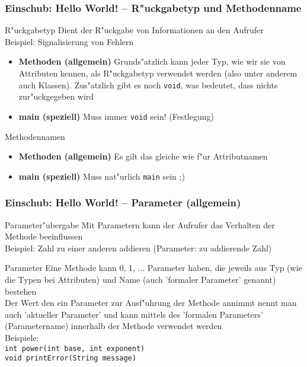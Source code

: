 \documentclass{beamer}
\begin{document}
\begin{frame}
\frametitle{Einschub: Hello World! -- R"uckgabetyp und Methodenname}
\begin{block}{R"uckgabetyp}
Dient der R"uckgabe von Informationen an den Aufrufer\\
Beispiel: Signalisierung von Fehlern\\
\begin{itemize}
\item \textbf{Methoden (allgemein)} Grunds"atzlich kann jeder Typ, wie wir sie von Attributen kennen, als R"uckgabetyp verwendet werden (also unter anderem auch Klassen). Zus"atzlich gibt es noch \texttt{void}, was bedeutet, dass nichts zur"uckgegeben wird
\item \textbf{main (speziell)} Muss immer \texttt{void} sein! (Festlegung)
\end{itemize}
\end{block}

\pause

\begin{block}{Methodennamen}
\begin{itemize}
\item \textbf{Methoden (allgemein)} Es gilt das gleiche wie f"ur Attributnamen
\item \textbf{main (speziell)} Muss nat"urlich \texttt{main} sein ;)
\end{itemize}
\end{block}
\end{frame}


\begin{frame}
\frametitle{Einschub: Hello World! -- Parameter (allgemein)}
\begin{block}{Parameter"ubergabe}
Mit Parametern kann der Aufrufer das Verhalten der Methode beeinflussen\\
Beispiel: Zahl zu einer anderen addieren (Parameter: zu addierende Zahl)
\end{block}

\pause

\begin{block}{Parameter}
Eine Methode kann 0, 1, ... Parameter haben, die jeweils aus Typ (wie die Typen bei Attributen) und Name (auch 'formaler Parameter' genannt) bestehen\\
Der Wert den ein Parameter zur Ausf"uhrung der Methode annimmt nennt man auch 'aktueller Parameter' und kann mittels des 'formalen Parameters' (Parametername) innerhalb der Methode verwendet werden\\
Beispiele:\\
\lstinline|int power(int base, int exponent)|\\
\lstinline|void printError(String message)|
\end{block}
\end{frame}
\end{document}
